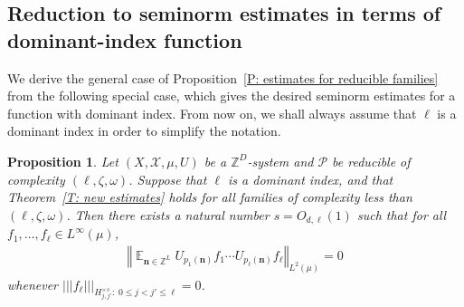 \documentclass[11pt]{amsart}
\newtheorem{proposition}[lemma]{Proposition}
\theoremstyle{definition}
\DeclareMathOperator*{\E}{\mathbb{E}}
\newcommand{\Z}{{\mathbb Z}}
\newcommand{\CP}{{\mathcal P}}
\newcommand{\CX}{{\mathcal X}}
\newcommand{\bn}{{\mathbf{n}}}
\newcommand{\norm}[1]{\left\Vert #1\right\Vert}
\newcommand{\nnorm}[1]{\lvert\!|\!| #1|\!|\!\rvert}
\newcommand{\1}{{\mathbf{1}}}
\begin{document}
\subsection{Reduction to seminorm estimates in terms of dominant-index function}
We derive the general case of Proposition~\ref{P: estimates for reducible families} from the following special case, which gives the desired seminorm estimates for a function with dominant index. From now on, we shall always assume that $\ell$ is a dominant index in order to simplify the notation.
\begin{proposition}\label{P: estimates for reducible families and dominant index}
    Let $(X, \CX, \mu, U)$ be a $\Z^D$-system and $\CP$ be reducible of complexity $(\ell, \zeta, \omega)$. %
    Suppose that $\ell$ is a dominant index, and that Theorem~\ref{T: new estimates} holds for all families of complexity less than $(\ell, \zeta, \omega)$. Then there exists a natural number $s=O_{d,\ell}(1)$ such that for all  $f_1, \ldots, f_\ell\in L^\infty(\mu)$,
    \begin{align}\label{E: vanishing average 2}
        \norm{\E_{\bn\in\Z^{L}} U_{p_1(\bn)}f_1\cdots U_{p_\ell(\bn)}f_\ell}_{L^2(\mu)} = 0
    \end{align}
    whenever $\nnorm{f_\ell}_{H_{j,{j'}}^{\times s}\colon\; 0\leq j<{j'}\leq \ell} = 0$.
\end{proposition}
\end{document}
